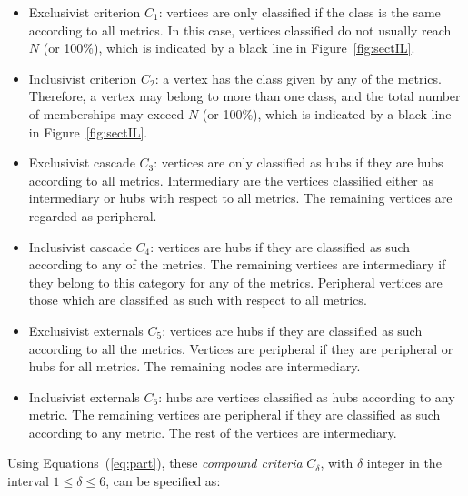 \begin{itemize}
\item Exclusivist criterion $C_1$:  vertices are only classified if the class is the same according to all metrics. In this case, vertices classified do not usually reach $N$ (or 100\%), which is indicated by a black line in Figure~\ref{fig:sectIL}.

\item Inclusivist criterion $C_2$: a vertex has the class given by any of the metrics. Therefore, a vertex may belong to more than one class, and the total number of memberships may exceed $N$ (or 100\%), which is indicated by a black line in Figure~\ref{fig:sectIL}.

\item Exclusivist cascade $C_3$: vertices are only classified as hubs if they are hubs according to all metrics. Intermediary are the vertices classified either as intermediary or hubs with respect to all metrics. The remaining vertices are regarded as peripheral.

\item Inclusivist cascade $C_4$: vertices are hubs if they are classified as such according to any of the metrics. The remaining vertices are intermediary if they belong to this category for any of the metrics. Peripheral vertices are those which are classified as such with respect to all metrics.

\item Exclusivist externals $C_5$: vertices are hubs if they are classified as such according to all the metrics. Vertices are peripheral if they are peripheral or hubs for all metrics. The remaining nodes are intermediary.

\item Inclusivist externals $C_6$: hubs are vertices classified as hubs according to any metric. The remaining vertices are peripheral if they are classified as such according to any metric. The rest of the vertices are intermediary.
\end{itemize}

Using Equations~(\ref{eq:part}), these \emph{compound criteria} $C_\delta$, with $\delta$ integer in the interval $1\leq\delta\leq6$, can be specified as:

